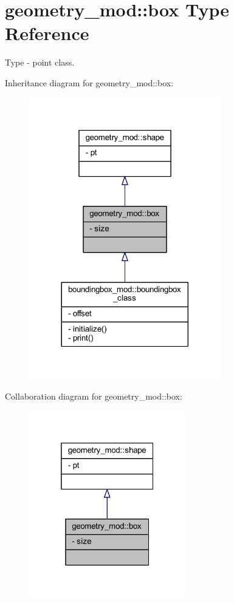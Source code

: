 \hypertarget{structgeometry__mod_1_1box}{}\section{geometry\+\_\+mod\+:\+:box Type Reference}
\label{structgeometry__mod_1_1box}


Type -\/ point class.  




Inheritance diagram for geometry\+\_\+mod\+:\+:box\+:
\nopagebreak
\begin{figure}[H]
\begin{center}
\leavevmode
\includegraphics[width=236pt]{structgeometry__mod_1_1box__inherit__graph}
\end{center}
\end{figure}


Collaboration diagram for geometry\+\_\+mod\+:\+:box\+:
\nopagebreak
\begin{figure}[H]
\begin{center}
\leavevmode
\includegraphics[width=193pt]{structgeometry__mod_1_1box__coll__graph}
\end{center}
\end{figure}
